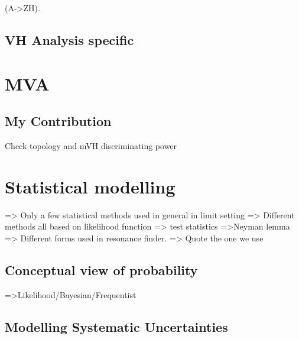  (A->ZH). 
\subsection{VH Analysis specific}


\section{MVA}
\subsection{My Contribution} 
Check topology and mVH discriminating power

\section{Statistical modelling}
=> Only a few statistical methods used in general in limit setting
=> Different methods all based on likelihood function 
=> test statistics =>Neyman lemma => Different forms used in resonance finder. => Quote the one we use 
\subsection{Conceptual view of probability}
=>Likelihood/Bayesian/Frequentist
\subsection{Modelling Systematic Uncertainties}


